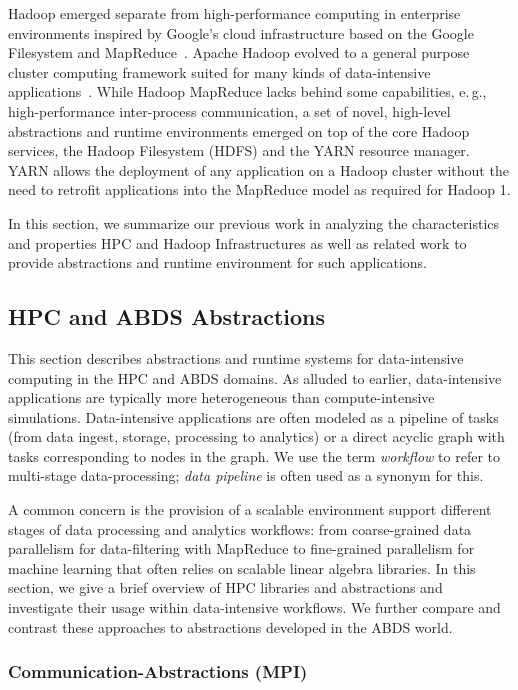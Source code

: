 \documentclass{sig-alternate}
\begin{document}
Hadoop emerged separate from high-performance computing in enterprise
environments inspired by Google's cloud infrastructure based on the Google
Filesystem and MapReduce~\cite{mapreduce}. Apache Hadoop evolved to a general
purpose cluster computing framework suited for many kinds of data-intensive
applications~\cite{tale-two-architectures}. While Hadoop MapReduce lacks behind
some capabilities, e.\,g., high-performance inter-process communication, a set
of novel, high-level abstractions and runtime environments emerged on top of
the core Hadoop services, the Hadoop Filesystem (HDFS) and the YARN resource
manager. YARN allows the deployment of any application on a Hadoop cluster 
without the need to retrofit applications into the MapReduce model as required 
for Hadoop 1.

In this section, we summarize our previous work in analyzing the
characteristics and properties HPC and Hadoop Infrastructures as well as
related work to provide abstractions and runtime environment for such
applications.


\subsection{HPC and ABDS Abstractions}


This section describes abstractions and runtime systems for data-intensive
computing in the HPC and ABDS domains. As alluded to earlier, data-intensive
applications are typically more heterogeneous than compute-intensive
simulations. Data-intensive applications are often modeled as a pipeline of
tasks (from data ingest, storage, processing to analytics) or a direct acyclic
graph with tasks corresponding to nodes in the graph. We use the term
\emph{workflow} to refer to multi-stage data-processing; \emph{data pipeline}
is often used as a synonym for this. 

A common concern is the provision of a scalable environment support different
stages of data processing and analytics workflows: from coarse-grained data
parallelism for data-filtering with MapReduce to fine-grained parallelism for
machine learning that often relies on scalable linear algebra libraries.
In this section, we give a brief overview of HPC libraries and abstractions and
investigate their usage within data-intensive workflows. We further compare and
contrast these approaches to abstractions developed in the ABDS world.


\subsubsection*{Communication-Abstractions (MPI)}
\end{document}
